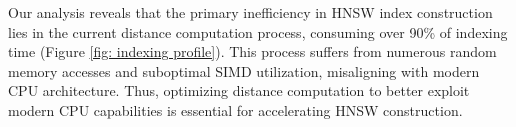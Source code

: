 Our analysis reveals that the primary inefficiency in HNSW index construction lies in the current distance computation process, consuming over 90\% of indexing time (Figure \ref{fig: indexing profile}). This process suffers from numerous random memory accesses and suboptimal SIMD utilization, misaligning with modern CPU architecture. Thus, optimizing distance computation to better exploit modern CPU capabilities is essential for accelerating HNSW construction.